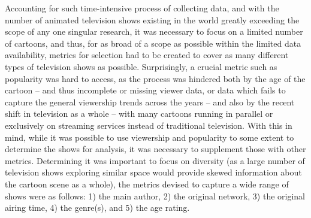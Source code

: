 \documentclass[a4paper, 11pt]{article}
\begin{document}
Accounting for such time-intensive process of collecting data, and with the number of animated television shows existing in the world greatly exceeding the scope of any one singular research, it was necessary to focus on a limited number of cartoons, and thus, for as broad of a scope as possible within the limited data availability, metrics for selection had to be created to cover as many different types of television shows as possible. Surprisingly, a crucial metric such as popularity was hard to access, as the process was hindered both by the age of the cartoon -- and thus incomplete or missing viewer data, or data which fails to capture the general viewership trends across the years -- and also by the recent shift in television as a whole -- with many cartoons running in parallel or exclusively on streaming services instead of traditional television. With this in mind, while it was possible to use viewership and popularity to some extent to determine the shows for analysis, it was necessary to supplement those with other metrics. Determining it was important to focus on diversity (as a large number of television shows exploring similar space would provide skewed information about the cartoon scene as a whole), the metrics devised to capture a wide range of shows were as follows: 1) the main author, 2) the original network, 3) the original airing time, 4) the genre(s), and 5) the age rating.
\end{document}
